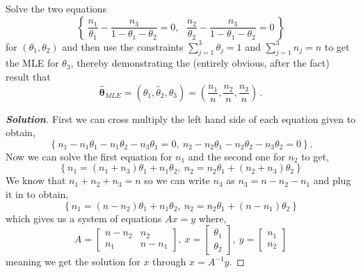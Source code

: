 \documentclass[12pt]{article}
\newcommand{\lrc}[1]{\left\{#1\right\}}
\newenvironment{solution}{\begin{tcolorbox}[breakable]\begin{proof}[\textbf{\textit{Solution}}] }{\end{proof}\end{tcolorbox}}
\begin{document}
\begin{itemize}
\begin{itemize}
\begin{itemize}
Solve the two equations
\begin{equation} \label{e:multinomial-8}
\left\{ \ \frac{ n_1 }{ \theta_1 } - \frac{ n_3 }{ 1 - \theta_1 - \theta_2 } = 0, \ \ \  \frac{ n_2 }{ \theta_2 } - \frac{ n_3 }{ 1 - \theta_1 - \theta_2 } = 0 \ \right\} 
\end{equation}
for $( \theta_1, \theta_2 )$ and then use the constraints $\sum_{ j = 1 }^3 \theta_j = 1$ and $\sum_{ j = 1 }^3 n_j = n$ to get the MLE for $\theta_3$, thereby demonstrating the (entirely obvious, after the fact) result that
\begin{equation} \label{e:multinomial-9}
\hat{ \bm{ \theta } }_{ MLE } = \left( \hat{ \theta }_1, \hat{ \theta }_2, \hat{ \theta }_3 \right) = \left( \frac{ n_1 }{ n }, \frac{ n_2 }{ n }, \frac{ n_3 }{ n } \right) \, .
\end{equation}
\fbox{\textbf{\textit{[5 points]}}} 
\begin{solution}
    First we can cross multiply the left hand side of each equation given to obtain,
    \[\lrc{n_1 - n_1\theta_1 -n_1\theta_2 - n_3\theta_1 = 0, \ n_2 - n_2\theta_1 - n_2\theta_2 - n_3 \theta_2= 0}.\]
    Now we can solve the first equation for $n_1$ and the second one for $n_2$ to get,
    \[\lrc{n_1 = (n_1 + n_3)\theta_1 + n_1\theta_2,\ n_2 = n_2\theta_1 + (n_2 + n_3)\theta_2}\]
    We know that $n_1 + n_2 + n_3 = n$ so we can write $n_3$ as $n_3 = n - n_2 - n_1$ and plug it in to obtain,
    \[\lrc{n_1 = (n- n_2)\theta_1 + n_1\theta_2, \ n_2 = n_2\theta_1 +  (n- n_1)\theta_2}\] 
    which gives us a system of equations $Ax = y$ where,
    \[A = \begin{bmatrix}
        n - n_2 & n_2 \\ 
        n_1 & n - n_1
    \end{bmatrix}, \ x = \begin{bmatrix}
        \theta_1 \\
        \theta_2 
    \end{bmatrix}, \ y = \begin{bmatrix}
        n_1 \\ n_2
    \end{bmatrix}\] meaning we get the solution for $x$ through $x = A^{-1}y$.


\end{solution}
\end{itemize}
\end{itemize}
\end{itemize}
\end{document}
